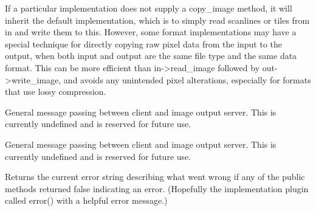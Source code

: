 If a particular \ImageOutput implementation does not supply a
{\cf copy_image} method, it will inherit the default implementation,
which is to simply read scanlines or tiles from {\cf in} and write
them to {\cf *this}.  However, some format implementations may have a
special technique for directly copying raw pixel data from the
input to the output, when both input and output are the same
file type and the same data format.  This can be more efficient 
than {\cf in->read_image} followed by {\cf out->write_image}, and avoids any
unintended pixel alterations, especially for formats that use
lossy compression.
\apiend

General message passing between client and image output server.
This is currently undefined and is reserved for future use.
\apiend

General message passing between client and image output server.
This is currently undefined and is reserved for future use.
\apiend

Returns the current error string describing what went wrong if
any of the public methods returned {\kw false} indicating an error.
(Hopefully the implementation plugin called {\kw error()} with a
helpful error message.)
\apiend




\chapwidthend
